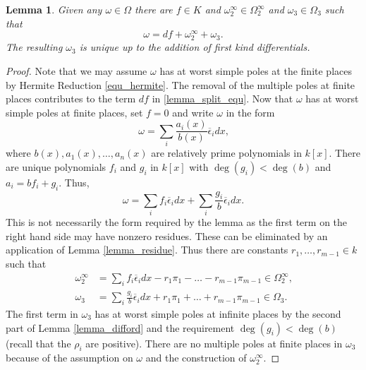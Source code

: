 \documentclass[12pt,reqno]{amsart}
\numberwithin{equation}{section}
\newtheorem{lemma}[theorem]{Lemma}
\newcommand{\op}[1]  { \operatorname{ #1 }}
\begin{document}
\begin{lemma}
Given any $\omega \in \Omega$ there are $f\in K$ and $\omega_2^{\infty} \in \Omega_2^{\infty}$ and $\omega_3 \in \Omega_3$ such that
 \begin{equation}
\label{lemma_split_equ}
  \omega  = df + \omega_2^{\infty} + \omega_3\text{.}
 \end{equation}
The resulting $\omega_3$ is unique up to the addition of first kind differentials.
\end{lemma}
\begin{proof}
Note that we may assume $\omega$ has at worst simple poles at the finite places by Hermite Reduction \eqref{equ_hermite}. The removal of the multiple poles at finite places contributes to the term $df$ in \eqref{lemma_split_equ}. Now that $\omega$ has at worst simple poles at finite places, set $f=0$ and write $\omega$ in the form
\begin{equation*}
 \omega = \sum_i \frac{a_i(x)}{b(x)} \overline{\epsilon}_i dx\text{,}
\end{equation*}
where $b(x),a_1(x),\dots,a_n(x)$ are relatively prime polynomials in $k[x]$. There are unique polynomials $f_i$ and $g_i$ in $k[x]$ with $\op{deg}(g_i)<\op{deg}(b)$ and $a_i = b f_i + g_i$. Thus,
\begin{equation*}
 \omega = \sum_i f_i \overline{\epsilon}_i dx + \sum_i \frac{g_i}{b} \overline{\epsilon}_i dx\text{.}
\end{equation*}
This is not necessarily the form required by the lemma as the first term on the right hand side may have nonzero residues. These can be eliminated by an application of Lemma \ref{lemma_residue}. Thus there are constants $r_1,\dots,r_{m-1} \in k$ such that
\begin{align*}
 \omega_2^{\infty} &= \sum_i f_i \overline{\epsilon}_i dx - r_1 \pi_1 - \dots - r_{m-1} \pi_{m-1} \in \Omega_2^\infty\text{,}\\
 \omega_3 &= \sum_i \frac{g_i}{b} \overline{\epsilon}_i dx + r_1 \pi_1 + \dots + r_{m-1} \pi_{m-1} \in \Omega_3\text{.}
\end{align*}
The first term in $\omega_3$ has at worst simple poles at infinite places by the second part of Lemma \ref{lemma_difford} and the requirement $\op{deg}(g_i)<\op{deg}(b)$ (recall that the $\rho_i$ are positive). There are no multiple poles at finite places in $\omega_3$ because of the assumption on $\omega$ and the construction of $\omega_2^{\infty}$.
\end{proof}
\end{document}
